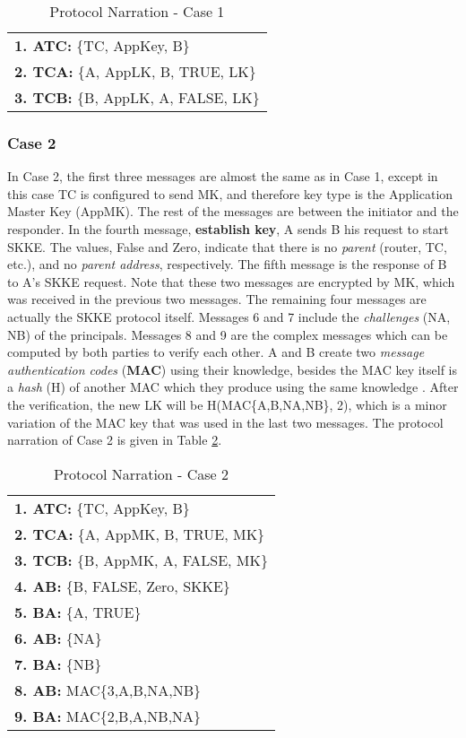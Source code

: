 \begin{table}\caption{Protocol Narration - Case 1}
\label{tab:protocolnarration1}
\centering
\begin{tabular}{l}  
\hline
\textbf{1. ATC:} \{TC, AppKey, B\}   \\
\textbf{2. TCA:} \{A, AppLK, B, TRUE, LK\}  \\
\textbf{3. TCB:} \{B, AppLK, A, FALSE, LK\}  \\
\hline
\end{tabular}
\end{table}

\subsubsection{Case 2}

In Case 2, the first three messages are almost the same as in Case 1, 
except in this case TC is configured to send MK, and therefore key type is the Application Master Key (AppMK). 
The rest of the messages are between the initiator and the responder. 
In the fourth message, \textbf{establish key}, A sends B his request to start SKKE. 
The values, False and Zero, indicate that there is no \emph{parent} (router, TC, etc.), and no \emph{parent address}, respectively. 
The fifth message is the response of B to A's SKKE request. 
Note that these two messages are encrypted by MK, which was received in the previous two messages. 
The remaining four messages are actually the SKKE protocol itself.
Messages 6 and 7 include the \emph{challenges} (NA, NB) of the principals. 
Messages 8 and 9 are the complex messages which can be computed by both parties to verify each other.
A and B create two \emph{message authentication codes} (\textbf{MAC}) 
using their knowledge, besides the MAC key itself is a \emph{hash} (H) of another MAC which they produce using the same knowledge \cite{HMAC}. 
After the verification, the new LK will be H(MAC\{A,B,NA,NB\}, 2), which is a minor variation of the MAC key that was used in the last two messages.
The protocol narration of Case 2 is given in Table \ref{tab:protocolnarration2}.

\begin{table}\caption{Protocol Narration - Case 2}
\label{tab:protocolnarration2}
\centering
\begin{tabular}{l}  
\hline
\textbf{1. ATC:} \{TC, AppKey, B\}   \\
\textbf{2. TCA:} \{A, AppMK, B, TRUE, MK\} \\
\textbf{3. TCB:} \{B, AppMK, A, FALSE, MK\} \\
\textbf{4. AB:} \{B, FALSE, Zero, SKKE\} \\
\textbf{5. BA:} \{A, TRUE\}                 \\                           
\textbf{6. AB:} \{NA\}      \\                
\textbf{7. BA:} \{NB\}                  \\                       
\textbf{8. AB:} MAC\{3,A,B,NA,NB\}        \\
\textbf{9. BA:} MAC\{2,B,A,NB,NA\}        \\
\hline
\end{tabular}
\end{table}


